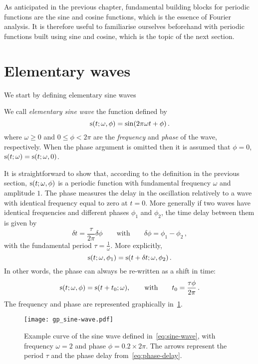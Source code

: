 As anticipated in the previous chapter, fundamental building blocks for periodic functions
are the sine and cosine functions, which is the essence of Fourier analysis. It is
therefore useful to familiarise ourselves beforehand with periodic functions built using
sine and cosine, which is the topic of the next section.
\section{Elementary waves}
We start by defining elementary sine waves
\begin{definition}
  \label{def:sine-wave}
  We call \emph{elementary sine wave} the function defined by
  \begin{equation}
    \operatorname{s}(t;\omega,\phi)=\sin(2\pi\omega t + \phi)\,.\label{eq:sine-wave}
  \end{equation}
  where $\omega\geq 0$ and $0\leq\phi<2\pi$ are the \emph{frequency} and \emph{phase} of
  the wave, respectively. When the phase argument is omitted then it is assumed that
  $\phi=0$, \ie $\operatorname{s}(t;\omega)=\operatorname{s}(t;\omega,0)$.
\end{definition}
\noindent It is straightforward to show that, according to the definition in the previous
section, $\operatorname{s}(t;\omega,\phi)$ is a periodic function with fundamental frequency $\omega$
and amplitude $1$. The phase measures the delay in the oscillation relatively to a wave
with identical frequency equal to zero at $t=0$. More generally if two waves have
identical frequencies and different phases $\phi_1$ and $\phi_2$, the time delay between
them is given by
\begin{equation}
  \delta t =\frac{\tau}{2\pi}\delta\phi\qquad\text{with}\qquad\delta\phi=\phi_1-\phi_2\,,
\end{equation}
with the fundamental period $\tau=\frac{1}{\omega}$. More explicitly,
\begin{equation}
  \operatorname{s}(t;\omega,\phi_1)=\operatorname{s}(t+\delta t;\omega,\phi_2)\,.
\end{equation}
In other words, the phase can always be re-written as a shift in time:
\begin{equation}
  \operatorname{s}(t;\omega,\phi)=\operatorname{s}(t+t_0;\omega),
  \qquad\text{with}\qquad
  t_0 = \frac{\tau\phi}{2\pi}\,.\label{eq:phase-delay}
\end{equation}
The frequency and phase are represented graphically in~\cref{fig:sine-wave}.
\begin{figure}[t]
  \centering
  \texttt{[image: gp\_sine-wave.pdf]}
  \caption{Example curve of the sine wave defined in~\cref{eq:sine-wave}, with frequency
    $\omega=2$ and phase $\phi=0.2\times 2\pi$. The arrows represent the period $\tau$ and
  the phase delay from~\cref{eq:phase-delay}.}
  \label{fig:sine-wave}
\end{figure}
